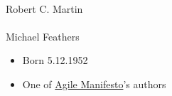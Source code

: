 \documentclass[calcdimensions,landscape,letterpaper]{powersem}
\newcommand{\thecurrentheading}{}
\newcommand{\heading}[1]{\renewcommand{\thecurrentheading}{#1}}
\begin{document}
\begin{slide}
  \heading{Robert C. Martin aka "Uncle Bob"}
  \begin{center}
    \begin{minipage}[c]{.3\textwidth}
      \begin{center}
        \\
        Robert C. Martin\bigskip\\
        \\
        Michael Feathers
      \end{center}
    \end{minipage}
    \begin{minipage}[c]{.65\textwidth}
      \begin{itemize}
        \item Born 5.12.1952
        \item One of \href{https://agilemanifesto.org/}{Agile Manifesto}'s authors

\end{itemize}
\end{minipage}
\end{center}
\end{slide}
\end{document}
